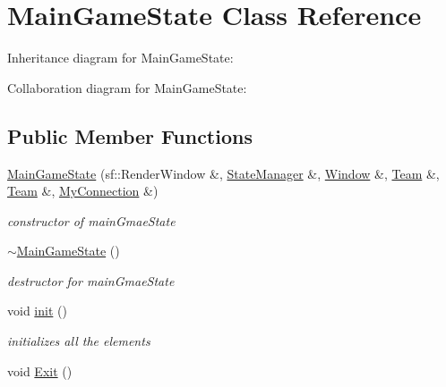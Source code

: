 \hypertarget{class_main_game_state}{\section{Main\+Game\+State Class Reference}
\label{class_main_game_state}
}


Inheritance diagram for Main\+Game\+State\+:


Collaboration diagram for Main\+Game\+State\+:
\subsection*{Public Member Functions}
\begin{DoxyCompactItemize}
\item 
\hypertarget{class_main_game_state_a15e60f2a88d4d01374eb300136496865}{\hyperlink{class_main_game_state_a15e60f2a88d4d01374eb300136496865}{Main\+Game\+State} (sf\+::\+Render\+Window \&, \hyperlink{class_state_manager}{State\+Manager} \&, \hyperlink{class_window}{Window} \&, \hyperlink{class_team}{Team} \&, \hyperlink{class_team}{Team} \&, \hyperlink{class_my_connection}{My\+Connection} \&)}\label{class_main_game_state_a15e60f2a88d4d01374eb300136496865}

\begin{DoxyCompactList}\small\item\em constructor of main\+Gmae\+State \end{DoxyCompactList}\item 
\hypertarget{class_main_game_state_addca1bf181d7480baab6f53606b33090}{\hyperlink{class_main_game_state_addca1bf181d7480baab6f53606b33090}{$\sim$\+Main\+Game\+State} ()}\label{class_main_game_state_addca1bf181d7480baab6f53606b33090}

\begin{DoxyCompactList}\small\item\em destructor for main\+Gmae\+State \end{DoxyCompactList}\item 
\hypertarget{class_main_game_state_a17ff09f026d104cb4495e37bc075456b}{void \hyperlink{class_main_game_state_a17ff09f026d104cb4495e37bc075456b}{init} ()}\label{class_main_game_state_a17ff09f026d104cb4495e37bc075456b}

\begin{DoxyCompactList}\small\item\em initializes all the elements \end{DoxyCompactList}\item 
\hypertarget{class_main_game_state_ad4670f402ba606c3f51aaf3e14a41e93}{void \hyperlink{class_main_game_state_ad4670f402ba606c3f51aaf3e14a41e93}{Exit} ()}\label{class_main_game_state_ad4670f402ba606c3f51aaf3e14a41e93}


\end{DoxyCompactItemize}
